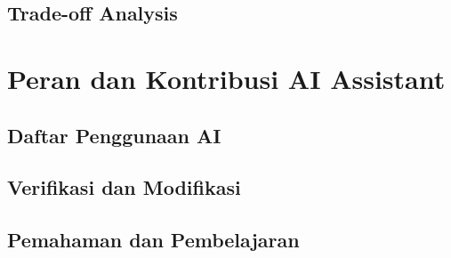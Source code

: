 \documentclass[11pt,a4paper]{article}
\begin{document}
\subsection{Trade-off Analysis}


\section{Peran dan Kontribusi AI Assistant}
\subsection{Daftar Penggunaan AI}

\subsection{Verifikasi dan Modifikasi}

\subsection{Pemahaman dan Pembelajaran}

\newpage


\end{document}
